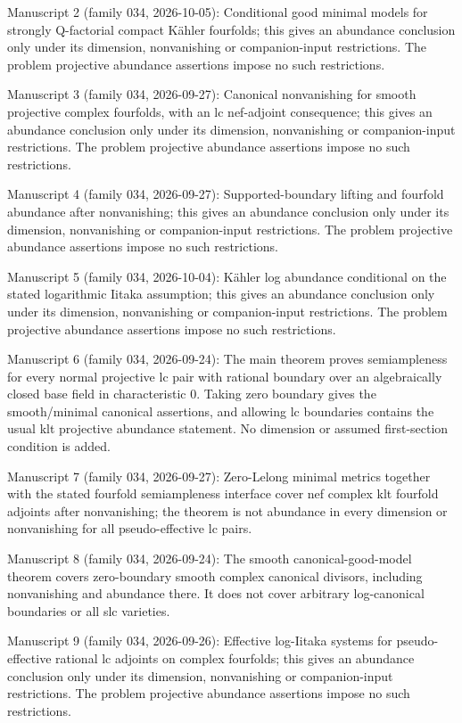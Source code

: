 \documentclass[11pt]{article}
\begin{document}
Manuscript 2 (family 034, 2026-10-05): Conditional good minimal models for strongly Q-factorial compact Kähler fourfolds; this gives an abundance conclusion only under its dimension, nonvanishing or companion-input restrictions. The problem projective abundance assertions impose no such restrictions.

Manuscript 3 (family 034, 2026-09-27): Canonical nonvanishing for smooth projective complex fourfolds, with an lc nef-adjoint consequence; this gives an abundance conclusion only under its dimension, nonvanishing or companion-input restrictions. The problem projective abundance assertions impose no such restrictions.

Manuscript 4 (family 034, 2026-09-27): Supported-boundary lifting and fourfold abundance after nonvanishing; this gives an abundance conclusion only under its dimension, nonvanishing or companion-input restrictions. The problem projective abundance assertions impose no such restrictions.

Manuscript 5 (family 034, 2026-10-04): Kähler log abundance conditional on the stated logarithmic Iitaka assumption; this gives an abundance conclusion only under its dimension, nonvanishing or companion-input restrictions. The problem projective abundance assertions impose no such restrictions.

Manuscript 6 (family 034, 2026-09-24): The main theorem proves semiampleness for every normal projective lc pair with rational boundary over an algebraically closed base field in characteristic $0$. Taking zero boundary gives the smooth/minimal canonical assertions, and allowing lc boundaries contains the usual klt projective abundance statement. No dimension or assumed first-section condition is added.

Manuscript 7 (family 034, 2026-09-27): Zero-Lelong minimal metrics together with the stated fourfold semiampleness interface cover nef complex klt fourfold adjoints after nonvanishing; the theorem is not abundance in every dimension or nonvanishing for all pseudo-effective lc pairs.

Manuscript 8 (family 034, 2026-09-24): The smooth canonical-good-model theorem covers zero-boundary smooth complex canonical divisors, including nonvanishing and abundance there. It does not cover arbitrary log-canonical boundaries or all slc varieties.

Manuscript 9 (family 034, 2026-09-26): Effective log-Iitaka systems for pseudo-effective rational lc adjoints on complex fourfolds; this gives an abundance conclusion only under its dimension, nonvanishing or companion-input restrictions. The problem projective abundance assertions impose no such restrictions.
\end{document}
